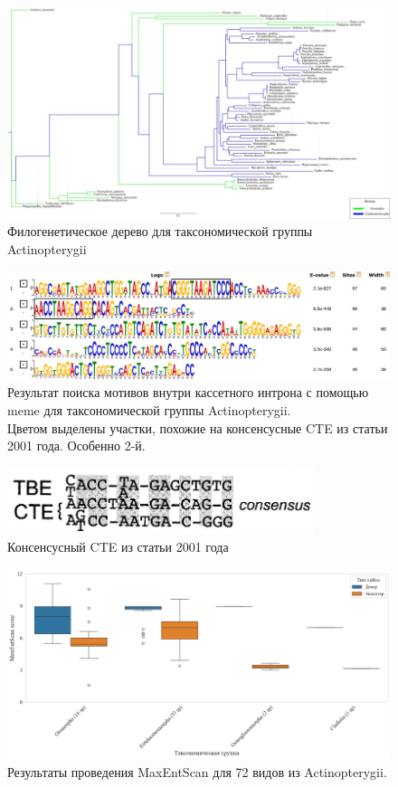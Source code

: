 \newpage
\begin{figure}[h] %
    \centering
    \includegraphics[width=1.0\textwidth]{images/Actinopterygii_tree}
    \caption{Филогенетическое дерево для таксономической группы Actinopterygii}
    \label{fig:Actinopterygii_tree}
\end{figure}


\newpage
\begin{figure}[h] %
    \centering
    \includegraphics[width=1.0\textwidth]{images/Actinopterygii_meme_motifs}
    \caption{Результат поиска мотивов внутри кассетного интрона с помощью meme для таксономической группы Actinopterygii.\\
    Цветом выделены участки, похожие на консенсусные CTE из статьи 2001 года. Особенно 2-й.}
    \label{fig:Actinopterygii_meme}
\end{figure}


\begin{figure}[h] %
    \centering
    \includegraphics[width=0.8\textwidth]{images/CTE_consensus}
    \caption{Консенсусный CTE из статьи 2001 года}
    \label{fig:CTE_consensus}
\end{figure}


\newpage
\begin{figure}[h] %
    \centering
    \includegraphics[width=1.0\textwidth]{images/Actinopterygii_maxentscan}
    \caption{Результаты проведения MaxEntScan для 72 видов из Actinopterygii.}
    \label{fig:Actinopterygii_maxentscan}
\end{figure}